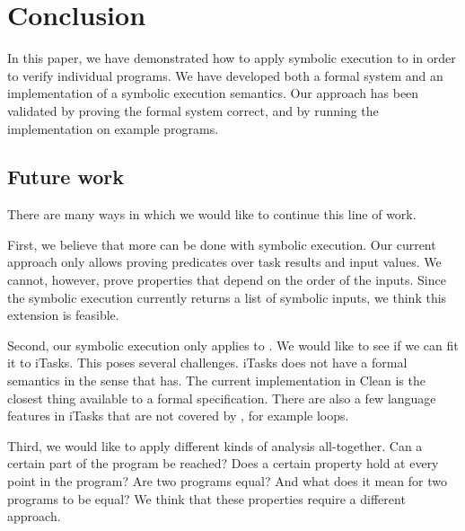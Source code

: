
\section{Conclusion}

\label{sec:conclusion}

In this paper, we have demonstrated how to apply symbolic execution to \TOPHAT in order to verify individual programs.
We have developed both a formal system and an implementation of a symbolic execution semantics.
Our approach has been validated by proving the formal system correct, and by running the implementation on example programs.

\subsection{Future work}

There are many ways in which we would like to continue this line of work.

First, we believe that more can be done with symbolic execution.
Our current approach only allows proving predicates over task results and input values.
We cannot, however, prove properties that depend on the order of the inputs.
Since the symbolic execution currently returns a list of symbolic inputs, we think this extension is feasible.

Second, our symbolic execution only applies to \TOPHAT.
We would like to see if we can fit it to iTasks.
This poses several challenges.
iTasks does not have a formal semantics in the sense that \TOPHAT has.
The current implementation in Clean is the closest thing available to a formal specification.
There are also a few language features in iTasks that are not covered by \TOPHAT, for example loops.

Third, we would like to apply different kinds of analysis all-together.
Can a certain part of the program be reached?
Does a certain property hold at every point in the program?
Are two programs equal? And what does it mean for two programs to be equal?
We think that these properties require a different approach.
